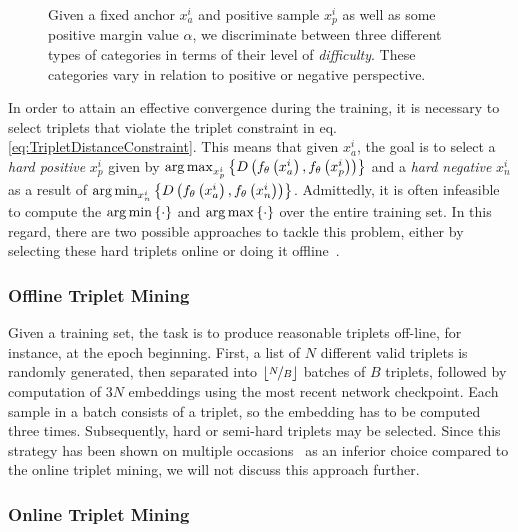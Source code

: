 \begin{figure}[t]
\begin{subfigure}[b]{0.35\textwidth}
        \caption[]{}
    \end{subfigure}
    \caption[Triplet loss categories visualization]{Given a fixed anchor $x_a^i$ and positive sample $x_p^i$ as well as some positive margin value $\alpha$, we discriminate between three different types of categories in terms of their level of \emph{difficulty}. These categories vary in relation to positive  or negative  perspective.}
    \label{fig:PositiveAndNegativeTripletsCategories}
\end{figure}

In order to attain an effective convergence during the training, it is necessary to select triplets that violate the triplet constraint in eq. \ref{eq:TripletDistanceConstraint}. This means that given $x_a^i$, the goal is to select a \emph{hard positive} $x_p^i$ given by $\operatorname*{arg\,max}_{x_p^i}\left\{ {{D} \left( {f_\theta} \left( x_a^i \right), {f_\theta} \left( x_p^i \right) \right)} \right\}$ and a \emph{hard negative} $x_n^i$ as a result of $\operatorname*{arg\,min}_{x_n^i}\left\{ {{D} \left( {f_\theta} \left( x_a^i \right), {f_\theta} \left( x_n^i \right) \right)} \right\}$. Admittedly, it is often infeasible to compute the $\operatorname*{arg\,min}\left\{ {\cdot} \right\}$ and $\operatorname*{arg\,max}\left\{ {\cdot} \right\}$ over the entire training set. In this regard, there are two possible approaches to tackle this problem, either by selecting these hard triplets online or doing it offline~\cite{schroff2015facenet}.

\subsubsection{Offline Triplet Mining}

Given a training set, the task is to produce reasonable triplets off-line, for instance, at the epoch beginning. First, a list of $N$ different valid triplets is randomly generated, then separated into $\lfloor \nicefrac{N}{B} \rfloor$ batches of $B$ triplets, followed by computation of $3N$ embeddings using the most recent network checkpoint. Each sample in a batch consists of a triplet, so the embedding has to be computed three times. Subsequently, hard or semi-hard triplets may be selected. Since this strategy has been shown on multiple occasions~\cite{schroff2015facenet, hermans2017triplet, kuma2019vehiclereid} as an inferior choice compared to the online triplet mining, we will not discuss this approach further.

\subsubsection{Online Triplet Mining}

